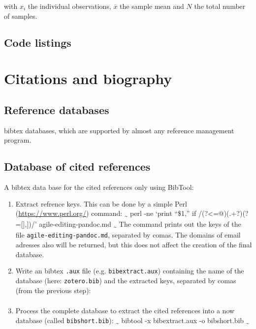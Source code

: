 \documentclass[10pt,fleq]{wlpeerj}
\providecommand{\tightlist}{%
  \setlength{\itemsep}{0pt}\setlength{\parskip}{0pt}}
\begin{document}
with
\(x_i\)
the
individual
observations,
\(\overline{x}\)
the sample
mean and
\(N\) the
total
number of
samples.

\subsection{Code
listings}\label{code-listings}

\section{Citations
and
biography}\label{citations-and-biography}

\subsection{Reference
databases}\label{reference-databases}

bibtex
databases,
which are
supported
by almost
any
reference
management
program.

\subsection{Database
of cited
references}\label{database-of-cited-references}

A bibtex
data base
for the
cited
references
only using
BibTool:

\begin{enumerate}
\def\labelenumi{\arabic{enumi}.}
\tightlist
\item
  Extract
  refrence
  keys.
  This can
  be done
  by a
  simple
  Perl
  (\url{https://www.perl.org/})
  command:
  \textsubscript{\textasciitilde{}}
  perl -ne
  `print
  ``\$1,''
  if
  /(?\textless{}=@)(.+?)(?={[}{]},{]})/'
  agile-editing-pandoc.md
  \textsubscript{\textasciitilde{}}
  The
  command
  prints
  out the
  keys of
  the file
  \texttt{agile-editing-pandoc.md},
  separated
  by
  comas.
  The
  domains
  of email
  adresses
  also
  will be
  returned,
  but this
  does not
  affect
  the
  creation
  of the
  final
  database.
\item
  Write an
  bibtex
  \texttt{.aux}
  file
  (e.g.
  \texttt{bibextract.aux})
  containing
  the name
  of the
  database
  (here:
  \texttt{zotero.bib})
  and the
  extracted
  keys,
  separated
  by comas
  (from
  the
  previous
  step):
  \textsubscript{\textsubscript{\textsubscript{
  }}}
\item
  Process
  the
  complete
  database
  to
  extract
  the
  cited
  references
  into a
  now
  database
  (called
  \texttt{bibshort.bib}):
  \textsubscript{\textasciitilde{}}
  bibtool
  -x
  bibextract.aux
  -o
  bibshort.bib
  \textsubscript{\textasciitilde{}}
\end{enumerate}
\end{document}

